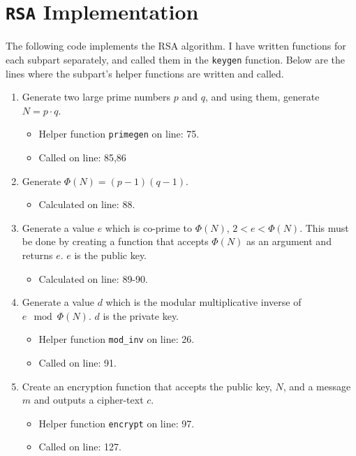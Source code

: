 \documentclass[a4paper]{article}
\begin{document}
\section{\texttt{RSA} Implementation}
The following code implements the RSA algorithm. I have written functions for each subpart separately, and called them in the \texttt{keygen} function. Below are the lines where the subpart's helper functions are written and called.

\begin{enumerate}
    \item Generate two large prime numbers $p$ and $q$, and using them, generate $N = p \cdot q$. 
        \begin{itemize}
            \item Helper function \texttt{primegen} on line: 75.
            \item Called on line: 85,86
        \end{itemize}
    
    \item Generate $\Phi(N) = (p-1)(q-1)$. 
        \begin{itemize}
            \item Calculated on line: 88.
        \end{itemize}
    
    \item Generate a value $e$ which is co-prime to $\Phi(N)$, $2 < e < \Phi(N)$. This must be done by creating a function that accepts $\Phi(N)$ as an argument and returns $e$. $e$ is the public key. 
        \begin{itemize}
            \item Calculated on line: 89-90.
        \end{itemize}
    
    \item Generate a value $d$ which is the modular multiplicative inverse of $e \mod \Phi(N)$. $d$ is the private key. 
        \begin{itemize}
            \item Helper function \texttt{mod\_inv} on line: 26.
            \item Called on line: 91.
        \end{itemize}
    
    \item Create an encryption function that accepts the public key, $N$, and a message $m$ and outputs a cipher-text $c$. 
        \begin{itemize}
            \item Helper function \texttt{encrypt} on line: 97.
            \item Called on line: 127.
        \end{itemize}
    

\end{enumerate}
\end{document}
